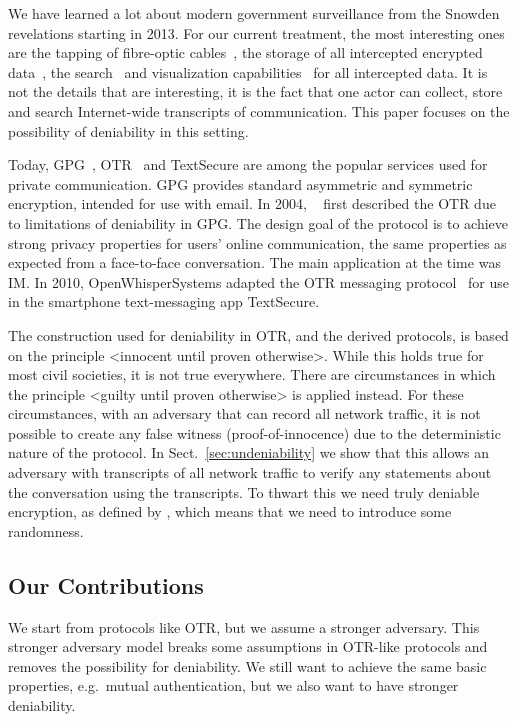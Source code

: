 We have learned a lot about modern government surveillance from the Snowden 
revelations starting in 2013.
For our current treatment, the most interesting ones are the tapping of 
fibre-optic cables~\cite{fibretap}, the storage of all intercepted encrypted 
data~\cite{cryptostore}, the search~\cite{xkeyscore} and visualization 
capabilities~\cite{boundlessinformant} for all intercepted data.
It is not the details that are interesting, it is the fact that one actor can 
collect, store and search Internet-wide transcripts of communication.
This paper focuses on the possibility of deniability in this setting.

Today, \ac{GPG}~\cite{gpg}, \ac{OTR}~\cite{otr} and Text\-Secure 
\cite{textsecure} are among the popular services used for private 
communication.
\ac{GPG} provides standard asymmetric and symmetric encryption, intended for 
use with email.
In 2004, \citeauthor{otr2004}~\cite{otr2004} first described the \ac{OTR} due 
to limitations of deniability in \ac{GPG}.
The design goal of the protocol is to achieve strong privacy properties for 
users' online communication, the same properties as expected from 
a face-to-face conversation.
The main application at the time was \ac{IM}.
In 2010, OpenWhisperSystems adapted the \ac{OTR} messaging 
protocol~\cite{frosch2014secure} for use in the smartphone text-messaging app 
TextSecure.

The construction used for deniability in \ac{OTR}, and the derived protocols, 
is based on the principle <innocent until proven otherwise>.
While this holds true for most civil societies, it is not true everywhere.
There are circumstances in which the principle <guilty until proven otherwise> 
is applied instead.
For these circumstances, with an adversary that can record all network traffic, 
it is not possible to create any false witness (proof-of-innocence) due to the 
deterministic nature of the protocol.
In Sect.~\ref{sec:undeniability} we show that this allows an adversary with 
transcripts of all network traffic to verify any statements about the 
conversation using the transcripts.
To thwart this we need truly deniable encryption, as defined by 
\citet{deniablecrypt}, which means that we need to introduce some randomness.

\subsection{Our Contributions}

We start from protocols like \ac{OTR}, but we assume a stronger adversary.
This stronger adversary model breaks some assumptions in \ac{OTR}-like 
protocols and removes the possibility for deniability.
We still want to achieve the same basic properties, e.g.~mutual authentication, 
but we also want to have stronger deniability.

